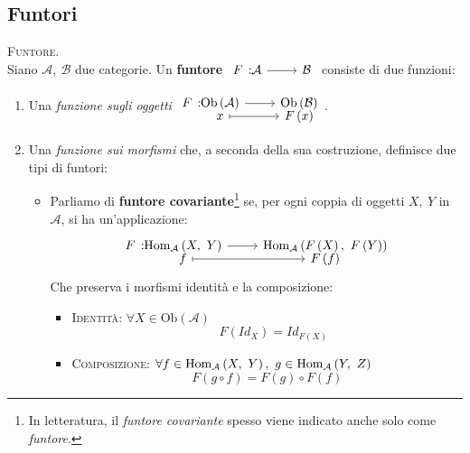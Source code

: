 \subsection{Funtori}
\begin{define}\textsc{Funtore.}\\
Siano $\mathcal{A},\ \mathcal{B}$ due categorie. Un \textbf{funtore} $\funz{F}{\mathcal{A}}{\mathcal{B}}$ consiste di due funzioni:
\begin{enumerate}
	\item Una \textit{funzione sugli oggetti} $\funztot{F}{\mathrm{Ob}\left(\mathcal{A}\right)}{\mathrm{Ob}\left(\mathcal{B}\right)}{x}{F\left(x\right)}$.
	\item Una \textit{funzione sui morfismi} che, a seconda della sua costruzione, definisce due tipi di funtori:
	\begin{itemize}
		\item Parliamo di \textbf{funtore covariante}\footnote{In letteratura, il \textit{funtore covariante} spesso viene indicato anche solo come \textit{funtore}.} se, per ogni coppia di oggetti $X,\ Y$ in $\mathcal{A}$, si ha un'applicazione:
		\begin{equation}
			\funztot{F}{\homo{\mathcal{A}}{X}{Y}}{\homo{\mathcal{A}}{F\left(X\right)}{F\left(Y\right)}}{f}{F\left(f\right)}
		\end{equation}
	Che preserva i morfismi identità e la composizione:
	\begin{itemize}
		\item \textsc{Identità}: $\forall X\in \mathrm{Ob}\left(\mathcal{A}\right)$
		\begin{equation}
			\quad F\left(Id_X\right)=Id_{F\left(X\right)}
		\end{equation}
		\item \textsc{Composizione}: $\forall f\in\homo{\mathcal{A}}{X}{Y},\ g\in\homo{\mathcal{A}}{Y}{Z}$
		\begin{equation}
			F\left(g\circ f\right)=F\left(g\right)\circ F\left(f\right)
		\end{equation}
	\end{itemize}
	\begin{center}
\end{center}
\end{itemize}
\end{enumerate}
\end{define}
